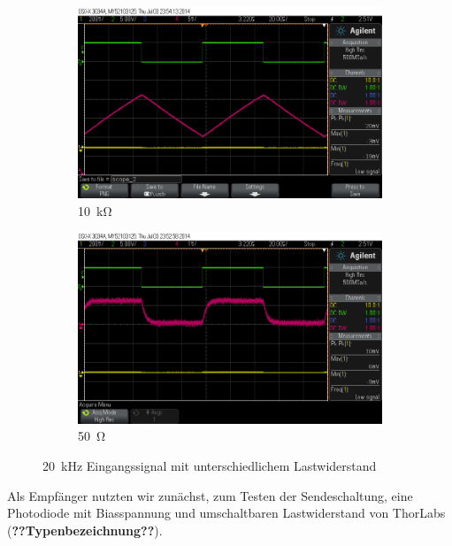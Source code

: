 \documentclass[12pt,a4paper]{article}
\begin{document}
\begin{figure}[h]
  \centering
  \begin{subfigure}[b]{0.6\textwidth}
    \includegraphics[width=\textwidth]{../measurements/20140703/20kHz_10kOhm/scope_2.png}
    \caption{\SI{10}{\kilo\ohm}}
    \label{fig:direct_rx_10k_R}
  \end{subfigure}  
  \begin{subfigure}[b]{0.6\textwidth}
    \includegraphics[width=\textwidth]{../measurements/20140703/20kHz_50_Ohm/scope_0.png}
    \caption{\SI{50}{\ohm}}
    \label{fig:direct_rx_50_R}
  \end{subfigure}  
  \caption{\SI{20}{\kilo\hertz} Eingangssignal mit unterschiedlichem Lastwiderstand}
  \label{fig:direct_rx}
\end{figure}

Als Empfänger nutzten wir zunächst, zum Testen der Sendeschaltung, eine Photodiode mit Biasspannung und umschaltbaren Lastwiderstand von ThorLabs (\textbf{??Typenbezeichnung??}).
\end{document}
